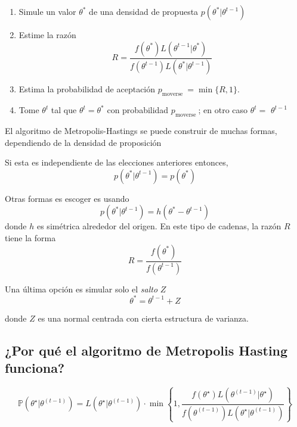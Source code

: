 \documentclass[
  12pt,
]{book}
\providecommand{\tightlist}{%
  \setlength{\itemsep}{0pt}\setlength{\parskip}{0pt}}
\theoremstyle{definition}
\theoremstyle{definition}
\theoremstyle{definition}
\theoremstyle{definition}
\theoremstyle{remark}
\begin{document}
\begin{enumerate}
\def\labelenumi{\arabic{enumi}.}
\tightlist
\item
  Simule un valor \(\theta^{*}\) de una densidad de propuesta
  \(p\left(\theta^{*} | \theta^{t-1}\right)\)
\item
  Estime la razón
  \[
   R=\frac{f\left(\theta^{*}\right) L\left(\theta^{t-1} |
    \theta^{*}\right)}{f\left(\theta^{t-1}\right) L\left(\theta^{*} |
    \theta^{t-1}\right)}
  \]
\item
  Estima la probabilidad de aceptación \(p_{\text {moverse }}=\min \{R, 1\}\).
\item
  Tome \(\theta^{t}\) tal que \(\theta^{t}=\theta^{*}\)
  con probabilidad \(p_{\text {moverse }}\); en otro caso \(\theta^{t}=\) \(\theta^{t-1}\)
\end{enumerate}

El algoritmo de Metropolis-Hastings se puede construir de muchas
formas, dependiendo de la densidad de proposición

Si esta es independiente de las elecciones anteriores entonces,
\[
 p\left(\theta^{*} | \theta^{t-1}\right)=p\left(\theta^{*}\right)
\]

Otras formas es escoger es usando
\[
 p\left(\theta^{*} |
 \theta^{t-1}\right)=h\left(\theta^{*}-\theta^{t-1}\right)
\]
donde \(h\) es simétrica alrededor del origen. En este tipo de
cadenas, la razón \(R\) tiene la forma
\[
 R=\frac{f\left(\theta^{*}\right)}{f\left(\theta^{t-1}\right)}
\]

Una última opción es simular solo el \emph{salto} \(Z\)
\[
 \theta^{*}=\theta^{t-1}+ Z
\]

donde \(Z\) es una normal centrada con cierta estructura de varianza.

\hypertarget{por-quuxe9-el-algoritmo-de-metropolis-hasting-funciona}{%
\subsection{¿Por qué el algoritmo de Metropolis Hasting funciona?}\label{por-quuxe9-el-algoritmo-de-metropolis-hasting-funciona}}

\begin{equation}
\mathbb{P}\left(\theta^{\star} | \theta^{(t-1)}\right)=L\left(\theta^{\star} | \theta^{(t-1)}\right) \cdot \min \left\{1, \frac{f\left(\theta^{\star}\right) L\left(\theta^{(t-1)} | \theta^{\star}\right)}{f\left(\theta^{(t-1)}\right) L\left(\theta^{\star} | \theta^{(t-1)}\right)}\right\}
\end{equation}
\end{document}
